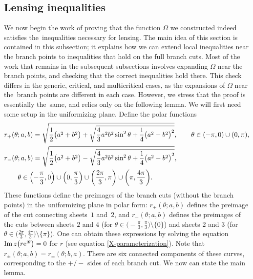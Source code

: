 \documentclass[10pt,a4paper]{amsart}
\numberwithin{equation}{section}
\begin{document}
\subsection{Lensing inequalities}\label{ssec:SecondTransformation}
We now begin the work of proving that the function $\Omega$ we constructed indeed satisfies the~inequalities necessary for lensing. The main idea of this
section is contained in this subsection; it explains how we can extend local inequalities near the branch points to inequalities that hold on the full
branch cuts. Most of the work that remains in the subsequent subsections involves expanding $\Omega$ near the branch points, and checking that the correct
inequalities hold there.
This check differs in the generic, critical, and multicritical cases, as the expansions of $\Omega$ near the~branch points
are different in each case. However, we stress that the proof is essentially the~same, and relies only on the following lemma. We will first need some setup
in the uniformizing plane. Define the polar functions
 \begin{align*}
 &r_+(\theta;a,b)= \sqrt{\frac{1}{2}\bigl(a^2+b^2\bigr) + \sqrt{\frac{4}{3} a^2b^2 \sin^2\theta + \frac{1}{4}\bigl(a^2-b^2\bigr)^2}}, \qquad \theta \in (-\pi,0)\cup (0,\pi),\\
 &r_-(\theta;a,b)= \sqrt{\frac{1}{2}\bigl(a^2+b^2\bigr) - \sqrt{\frac{4}{3} a^2b^2 \sin^2\theta + \frac{1}{4}\bigl(a^2-b^2\bigr)^2}},\\
 &\qquad\theta\in \Bigl(-\frac{\pi}{3}, 0\Bigr)\cup\Bigl(0,\frac{\pi}{3}\Bigr) \cup \biggl(\frac{2\pi}{3},\pi\biggr)\cup \biggl(\pi,\frac{4\pi}{3}\biggr) \nonumber.
 \end{align*}
 These functions define the preimages of the branch cuts (without the branch points) in the~uniformizing plane in polar form: $r_+(\theta;a,b)$ defines the
 preimage of the cut connecting sheets~$1$ and~$2$, and $r_-(\theta;a,b)$ defines the preimages of the cuts between sheets $2$ and $4$ \big(for $\theta\in\bigl(-\frac{\pi}{3},\frac{\pi}{3}\bigr)\setminus\{0\}$\big) and sheets $2$ and $3$ \big(for $\theta\in \bigl(\frac{2\pi}{3},\frac{4\pi}{3}\bigr) \setminus\{\pi\}$\big). One can obtain these expressions by solving the equation
 $\operatorname{Im} z \bigl(r{\rm e}^{{\rm i}\theta}\bigr) = 0$ for $r$ (see equation \eqref{X-parameterization}). Note that $r_{\pm}(\theta;a,b) = r_{\pm}(\theta;b,a)$.
 There are six connected components of these curves, corresponding to the $+/-$ sides of each branch cut. We now can state the main lemma.
\end{document}
